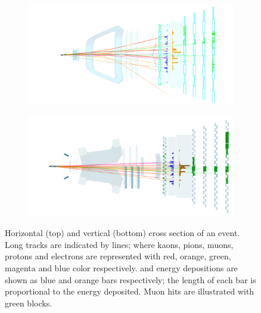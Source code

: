 \begin{figure}[t]
  \centering
  \begin{subfigure}{\textwidth}
    \includegraphics[width=\textwidth]{Figures/Chapter2/top}
    \label{det_evt_display_top}
  \end{subfigure}
  \begin{subfigure}{\textwidth}
    \includegraphics[width=\textwidth]{Figures/Chapter2/side}
    \label{det_evt_display_side}
  \end{subfigure}
  \caption{Horizontal (top) and vertical (bottom) cross section of an \lhcb event.
           Long tracks are indicated by lines; where kaons, pions, muons, protons and electrons
           are represented with red, orange, green, magenta and blue color respectively. \ecal and \hcal energy depositions
           are shown as blue and orange bars respectively; the length of each bar is proportional to the energy deposited.
           Muon hits are illustrated with green blocks.}
  \label{det_evt_display}
\end{figure}
